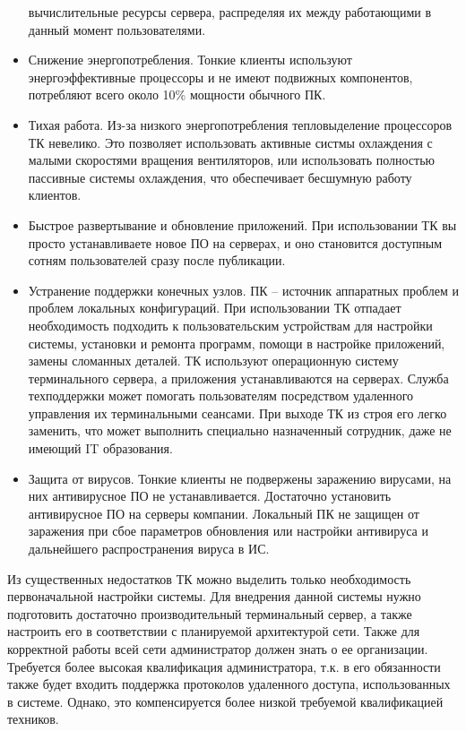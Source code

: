 \begin{itemize}
        вычислительные ресурсы сервера, распределяя их между работающими в данный момент
        пользователями.
    \item   Снижение энергопотребления. Тонкие клиенты используют
        энергоэффективные процессоры и не имеют подвижных компонентов, потребляют всего
        около 10\% мощности обычного ПК.
    \item   Тихая работа. Из-за низкого энергопотребления тепловыделение процессоров ТК
        невелико. Это позволяет использовать активные систмы охлаждения с малыми
        скоростями вращения вентиляторов, или использовать полностью пассивные системы
        охлаждения, что обеспечивает бесшумную работу клиентов.
    \item   Быстрое развертывание и обновление приложений. При использовании ТК вы
        просто устанавливаете новое ПО на серверах, и оно становится доступным сотням
        пользователей сразу после публикации.
    \item   Устранение поддержки конечных узлов. ПК – источник аппаратных проблем и
        проблем локальных конфигураций. При использовании ТК отпадает необходимость
        подходить к пользовательским устройствам для настройки системы, установки и
        ремонта программ, помощи в настройке приложений, замены сломанных деталей. ТК
        используют операционную систему терминального сервера, а приложения
        устанавливаются на серверах. Служба техподдержки может помогать пользователям
        посредством удаленного управления их терминальными сеансами. При выходе ТК из
        строя его легко заменить, что может выполнить специально назначенный сотрудник,
        даже не имеющий IT образования.
    \item   Защита от вирусов. Тонкие клиенты не подвержены заражению вирусами, на них
        антивирусное ПО не устанавливается. Достаточно установить антивирусное ПО на
        серверы компании. Локальный ПК не защищен от заражения при сбое параметров
        обновления или настройки антивируса и дальнейшего распространения вируса в ИС.
\end{itemize}

Из существенных недостатков ТК можно выделить только необходимость первоначальной 
настройки системы. Для внедрения данной системы нужно подготовить достаточно
производительный терминальный сервер, а также настроить его в соответствии с планируемой
архитектурой сети.
Также для корректной работы всей сети администратор должен знать о ее организации.
Требуется более высокая квалификация администратора, т.к. в его обязанности также будет
входить поддержка протоколов удаленного доступа, использованных в системе. 
Однако, это компенсируется более низкой требуемой квалификацией техников.
